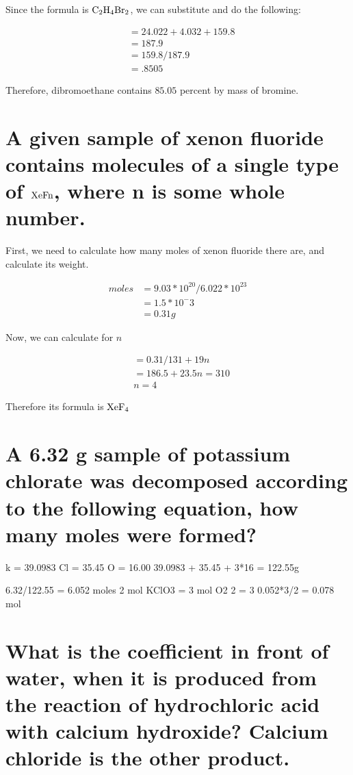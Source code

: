 \documentclass{scrartcl}
\begin{document}
Since the formula is  \(\ce{C2H4Br2}\), we can substitute and do the following:

\begin{align*}
&= 24.022 + 4.032 + 159.8\\
&= 187.9\\
&= 159.8/187.9\\
&=.8505
\end{align*}

Therefore, dibromoethane contains \(85.05\) percent by mass of bromine.

\section{A given sample of xenon fluoride contains molecules of a single type of \(\ce{XeFn}\), where n is some whole number.}
\label{sec:org35fc056}

First, we need to calculate how many moles of xenon fluoride there are, and
calculate its weight.

\begin{align*}
moles&=9.03*10^{20}/6.022*10^{23}\\
&= 1.5*10^-3\\
&= 0.31g
\end{align*}

Now, we can calculate for \(n\)

\begin{align*}
&= 0.31/131+19n\\
&= 186.5 + 23.5n = 310\\
&n = 4
\end{align*}

Therefore its formula is \(\ce{XeF4}\)

\section{A 6.32 g sample of potassium chlorate was decomposed according to the following equation, how many moles were formed?}
\label{sec:orga94a8da}

k = 39.0983
Cl = 35.45
O = 16.00
39.0983 + 35.45 + 3*16 = 122.55g

6.32/122.55 = 6.052 moles
2 mol KClO3 = 3 mol O2
2 = 3
0.052*3/2
= 0.078 mol

\section{What is the coefficient in front of water, when it is produced from the reaction of hydrochloric acid with calcium hydroxide? Calcium chloride is the other product.}
\label{sec:org5dd384e}
\end{document}
